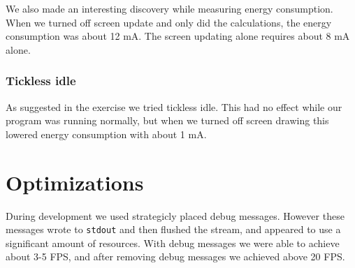 We also made an interesting discovery while measuring energy consumption. When we turned off screen update and only did the calculations, the energy consumption was about 12 mA. The screen updating alone requires about 8 mA alone.

\subsubsection{Tickless idle}
As suggested in the exercise we tried tickless idle. This had no effect while our program was running normally, but when we turned off screen drawing this lowered energy consumption with about 1 mA.

\section{Optimizations}
During development we used strategicly placed debug messages. However these messages wrote to \texttt{stdout} and then flushed the stream, and appeared to use a significant amount of resources. With debug messages we were able to achieve about 3-5 FPS, and after removing debug messages we achieved above 20 FPS.